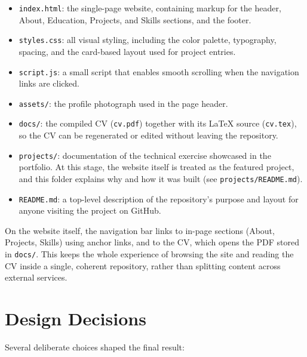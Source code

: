 \documentclass[11pt,a4paper]{article}
\begin{document}
\begin{itemize}
  \item \texttt{index.html}: the single-page website, containing markup for the header, About,
        Education, Projects, and Skills sections, and the footer.
  \item \texttt{styles.css}: all visual styling, including the color palette, typography,
        spacing, and the card-based layout used for project entries.
  \item \texttt{script.js}: a small script that enables smooth scrolling when the navigation
        links are clicked.
  \item \texttt{assets/}: the profile photograph used in the page header.
  \item \texttt{docs/}: the compiled CV (\texttt{cv.pdf}) together with its LaTeX source
        (\texttt{cv.tex}), so the CV can be regenerated or edited without leaving the repository.
  \item \texttt{projects/}: documentation of the technical exercise showcased in the
        portfolio. At this stage, the website itself is treated as the featured project, and this
        folder explains why and how it was built (see \texttt{projects/README.md}).
  \item \texttt{README.md}: a top-level description of the repository's purpose and layout for
        anyone visiting the project on GitHub.
\end{itemize}

On the website itself, the navigation bar links to in-page sections (About, Projects, Skills)
using anchor links, and to the CV, which opens the PDF stored in \texttt{docs/}. This keeps the
whole experience of browsing the site and reading the CV inside a single, coherent repository,
rather than splitting content across external services.

\section{Design Decisions}
Several deliberate choices shaped the final result:
\end{document}

